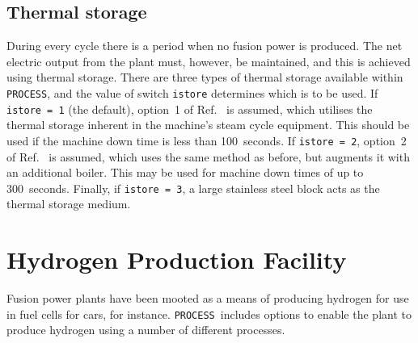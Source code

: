 \documentclass[11pt,a4paper]{report}
\newcommand{\process}{\mbox{\texttt{PROCESS}}}
\begin{document}
\subsection{Thermal storage}

During every cycle there is a period when no fusion power is produced. The net
electric output from the plant must, however, be maintained, and this is
achieved using thermal storage. There are three types of thermal storage
available within \process, and the value of switch \texttt{istore} determines
which is to be used. If \texttt{istore = 1} (the default), option~1 of
Ref.~\cite{ELECTROWATT} is assumed, which utilises the thermal storage
inherent in the machine's steam cycle equipment. This should be used if the
machine down time is less than 100~seconds. If \texttt{istore = 2}, option~2
of Ref.~\cite{ELECTROWATT} is assumed, which uses the same method as before,
but augments it with an additional boiler. This may be used for machine down
times of up to 300~seconds. Finally, if \texttt{istore = 3}, a large stainless
steel block acts as the thermal storage medium.

\section{Hydrogen Production Facility}

Fusion power plants have been mooted as a means of producing hydrogen for use
in fuel cells for cars, for instance. \process\ includes options to enable
the plant to produce hydrogen using a number of different processes.
\end{document}
